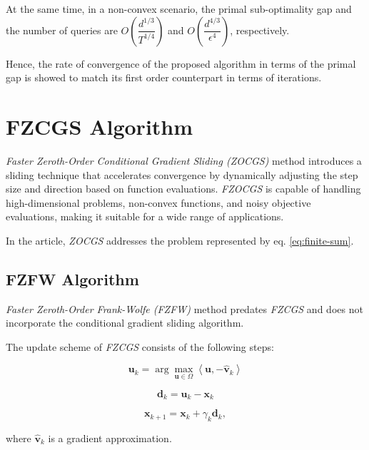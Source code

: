 \begin{multicols}{2}
At the same time, in a non-convex scenario, the primal sub-optimality gap and the
number of queries are $O(\dfrac{d^{1/3}}{T^{1/4}})$ and $O\left(\dfrac{d^{4/3}}{\epsilon^4}\right)$, 
respectively.

Hence, the rate of convergence of the proposed algorithm in terms of the 
primal gap is showed to match its first order counterpart in terms
of iterations.

\section{FZCGS Algorithm}

\textit{Faster Zeroth-Order Conditional Gradient Sliding (ZOCGS)} method introduces 
a sliding technique that accelerates convergence by dynamically adjusting 
the step size and direction based on function evaluations. 
\textit{FZOCGS} is capable of handling high-dimensional problems, non-convex functions, 
and noisy objective evaluations, making it suitable for a wide range of applications.

In the article, \textit{ZOCGS} addresses the problem represented by 
eq. \eqref{eq:finite-sum}.


\subsection{FZFW Algorithm}

\textit{Faster Zeroth-Order Frank-Wolfe (FZFW)} method predates \textit{FZCGS} and does not 
incorporate the conditional gradient sliding algorithm.

The update scheme of \textit{FZCGS} consists of the following steps:

\begin{equation}
    \mathbf{u}_k=\arg \max _{\mathbf{u} \in \Omega}\left\langle\mathbf{u},-\hat{\mathbf{v}}_k\right\rangle 
\label{eq:gao-u-update}
\end{equation}
    
\begin{equation}
    \mathbf{d}_k=\mathbf{u}_k-\mathbf{x}_k
\label{eq:gao-d-update}
\end{equation}

\begin{equation}
    \mathbf{x}_{k+1}=\mathbf{x}_k+\gamma_k \mathbf{d}_k,
\label{eq:gao-x-update}
\end{equation}

where $\hat{\mathbf{v}}_k$ is a gradient approximation.


\end{multicols}
